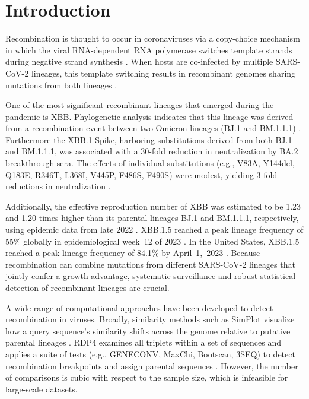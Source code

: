\documentclass[11pt,oneside,letterpaper]{article}
\begin{document}
\pagebreak

\section{Introduction}

Recombination is thought to occur in coronaviruses via a copy-choice mechanism in which the viral RNA-dependent RNA polymerase switches template strands during negative strand synthesis \cite{chrisman_indels_2021}. When hosts are co-infected by multiple SARS-CoV-2 lineages, this template switching results in recombinant genomes sharing mutations from both lineages \cite{tremeaux_sars-cov-2_2023}.

One of the most significant recombinant lineages that emerged during the pandemic is XBB. Phylogenetic analysis indicates that this lineage was derived from a recombination event between two Omicron lineages (BJ.1 and BM.1.1.1) \cite{tamura_virological_2023}. Furthermore the XBB.1 Spike, harboring substitutions derived from both BJ.1 and BM.1.1.1, was associated with a 30-fold reduction in neutralization by BA.2 breakthrough sera. The effects of individual substitutions (e.g., V83A, Y144del, Q183E, R346T, L368I, V445P, F486S, F490S) were modest, yielding 3-fold reductions in neutralization \cite{tamura_virological_2023}.

Additionally, the effective reproduction number of XBB was estimated to be 1.23 and 1.20 times higher than its parental lineages BJ.1 and BM.1.1.1, respectively, using epidemic data from late 2022 \cite{tamura_virological_2023}. XBB.1.5 reached a peak lineage frequency of 55\% globally in epidemiological week~12 of 2023 \cite{erkihun_current_2024}. In the United States, XBB.1.5 reached a peak lineage frequency of 84.1\% by April~1,~2023 \cite{ma_genomic_2023}. Because recombination can combine mutations from different SARS-CoV-2 lineages that jointly confer a growth advantage, systematic surveillance and robust statistical detection of recombinant lineages are crucial.

A wide range of computational approaches have been developed to detect recombination in viruses. Broadly, similarity methods such as SimPlot visualize how a query sequence’s similarity shifts across the genome relative to putative parental lineages \cite{samson_simplot_2022, salminen_identification_1995}. RDP4 examines all triplets within a set of sequences and applies a suite of tests (e.g., GENECONV, MaxChi, Bootscan, 3SEQ) to detect recombination breakpoints and assign parental sequences \cite{martin_rdp4_2015, sawyer_statistical_1989, posada_evaluation_2001, lam_improved_2018}. However, the number of comparisons is cubic with respect to the sample size, which is infeasible for large-scale datasets.
\end{document}
